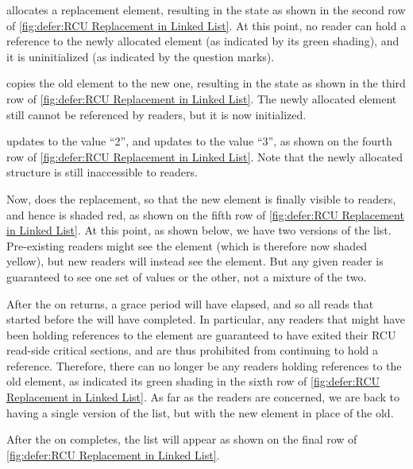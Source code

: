 \begin{fcvref}
 allocates a replacement element,
resulting in the state as shown in the second row of
\cref{fig:defer:RCU Replacement in Linked List}.
At this point, no reader can hold a reference to the newly allocated
element (as indicated by its green shading), and it is uninitialized
(as indicated by the question marks).

 copies the old element to the new one, resulting in the
state as shown in the third row of
\cref{fig:defer:RCU Replacement in Linked List}.
The newly allocated element still cannot be referenced by readers, but
it is now initialized.

 updates  to the value ``2'', and
 updates  to the value ``3'',
as shown on the fourth row of
\cref{fig:defer:RCU Replacement in Linked List}.
Note that the newly allocated structure is still inaccessible to readers.

Now,  does the replacement, so that the new element is
finally visible to readers, and hence is shaded red, as shown on
the fifth row of
\cref{fig:defer:RCU Replacement in Linked List}.
At this point, as shown below, we have two versions of the list.
Pre-existing readers might see the  element (which is
therefore now shaded yellow), but
new readers will instead see the  element.
But any given reader is guaranteed to see one set of values or the
other, not a mixture of the two.

After the  on  returns,
a grace period will have elapsed, and so all reads that started before the
 will have completed.
In particular, any readers that might have been holding references
to the  element are guaranteed to have exited
their RCU read-side critical sections, and are thus prohibited from
continuing to hold a reference.
Therefore, there can no longer be any readers holding references
to the old element, as indicated its green shading in the sixth row of
\cref{fig:defer:RCU Replacement in Linked List}.
As far as the readers are concerned, we are back to having a single version
of the list, but with the new element in place of the old.

After the  on  completes, the list will
appear as shown on the final row of
\cref{fig:defer:RCU Replacement in Linked List}.
\end{fcvref}

